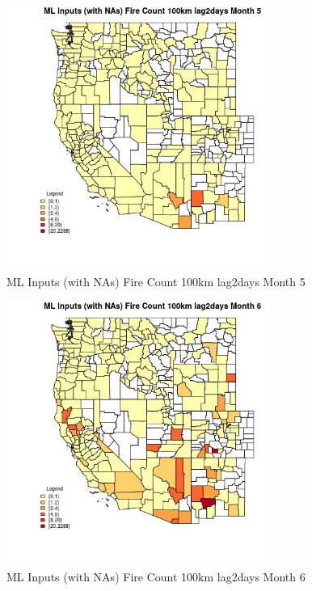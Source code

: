 \begin{figure} 
\centering  
\includegraphics[width=0.77\textwidth]{Code_Outputs/Report_ML_input_PM25_Step4_part_e_de_duplicated_aves_compiled_2019-05-20wNAs_CountyFire_Count_100km_lag2daysmedianMonth5.jpg} 
\caption{\label{fig:Report_ML_input_PM25_Step4_part_e_de_duplicated_aves_compiled_2019-05-20wNAsCountyFire_Count_100km_lag2daysmedianMonth5}ML Inputs (with NAs) Fire Count 100km lag2days Month 5} 
\end{figure} 
 

\begin{figure} 
\centering  
\includegraphics[width=0.77\textwidth]{Code_Outputs/Report_ML_input_PM25_Step4_part_e_de_duplicated_aves_compiled_2019-05-20wNAs_CountyFire_Count_100km_lag2daysmedianMonth6.jpg} 
\caption{\label{fig:Report_ML_input_PM25_Step4_part_e_de_duplicated_aves_compiled_2019-05-20wNAsCountyFire_Count_100km_lag2daysmedianMonth6}ML Inputs (with NAs) Fire Count 100km lag2days Month 6} 
\end{figure} 
 

